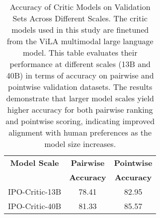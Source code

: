 \begin{table}[htp]
    \centering
    \tabcolsep=6pt
    \setlength{\abovecaptionskip}{0.1cm}
    \renewcommand{\arraystretch}{1.2}
    \begin{tabular}{c c c}
    \toprule 
    \textbf{Model Scale} & \textbf{Pairwise } & \textbf{Pointwise } \\
                         & \textbf{Accuracy}  & \textbf{Accuracy}   \\
    \midrule
    IPO-Critic-13B & 78.41 & 82.95 \\
    IPO-Critic-40B & 81.33 & 85.57 \\
    \bottomrule
    \end{tabular}
    \caption{Accuracy of Critic Models on Validation Sets Across Different Scales.
    The critic models used in this study are finetuned from the ViLA\cite{lin2023vila} multimodal large language model. This table evaluates their performance at different scales (13B and 40B) in terms of accuracy on pairwise and pointwise validation datasets. The results demonstrate that larger model scales yield higher accuracy for both pairwise ranking and pointwise scoring, indicating improved alignment with human preferences as the model size increases.}
    \label{results_critic}
    \vspace{-0.5cm}
\end{table}